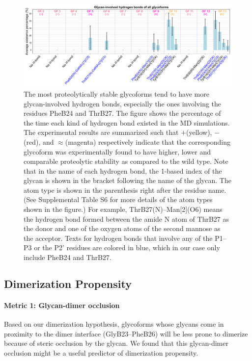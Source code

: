 \documentclass[9pt]{elife}
\begin{document}
\begin{figure}[H]
\centering
\includegraphics[width=\textwidth]{Figures/hbond_results.png}
\caption{The most proteolytically stable glycoforms tend to have more glycan-involved hydrogen bonds, especially the ones involving the residues PheB24 and ThrB27. The figure shows the percentage of the time each kind of hydrogen bond existed in the MD simulations. The experimental results are summarized such that $+$(yellow), $-$(red), and $\approx$(magenta) respectively indicate that the corresponding glycoform was experimentally found to have higher, lower and comparable proteolytic stability as compared to the wild type. Note that in the name of each hydrogen bond, the 1-based index of the glycan is shown in the bracket following the name of the glycan. The atom type is shown in the parenthesis right after the residue name. (See Supplemental Table S6 for more details of the atom types shown in the figure.) For example, ThrB27(N)--Man[2](O6) means the hydrogen bond formed between the amide N atom of ThrB27 as the donor and one of the oxygen atoms of the second mannose as the acceptor. Texts for hydrogen bonds that involve any of the P1--P3 or the P2' residues are colored in blue, which in our case only include PheB24 and ThrB27.}
\label{result_hbond}
\end{figure}

\subsection{Dimerization Propensity}
\paragraph{Metric 1: Glycan-dimer occlusion}
Based on our dimerization hypothesis, glycoforms whose glycans come in proximity to the dimer interface (GlyB23--PheB26) will be less prone to dimerize because of steric occlusion by the glycan. We found that this glycan-dimer occlusion might be a useful predictor of dimerization propensity. 
\end{document}
